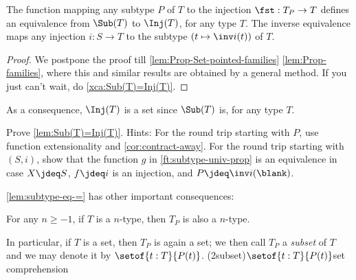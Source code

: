 \begin{lemma}\label{lem:Sub(T)=Inj(T)}
The function mapping any subtype $P$ of $T$ to the injection 
$\fst: T_P\to T$ defines an
equivalence from $\Sub(T)$ to $\Inj(T)$, for any type $T$.
The inverse equivalence maps any injection $i:S\to T$ to 
the subtype $(t\mapsto \inv i (t))$ of $T$.
\end{lemma}
\begin{proof}
We postpone the proof till \cref{lem:Prop-Set-pointed-families}
\ref{lem:Prop-families}, where this and similar results are obtained 
by a general method. If you just can't wait, do \cref{xca:Sub(T)=Inj(T)}.
\end{proof}

As a consequence, $\Inj(T)$ is a set since $\Sub(T)$ is, for any type $T$.
\addtocounter{footnote}{-1}

\begin{xca}\label{xca:Sub(T)=Inj(T)}
Prove \cref{lem:Sub(T)=Inj(T)}. Hints: %
For the round trip starting with $P$, use function extensionality and
\cref{cor:contract-away}. For the round trip starting with $(S,i)$,
show that the function $g$ in \cref{ft:subtype-univ-prop} is an equivalence
in case $X\jdeq S$, $f\jdeq i$ is an injection, and $P\jdeq\inv i(\blank)$.
\end{xca}

\cref{lem:subtype-eq-=} has other important consequences:
\begin{corollary}\label{cor:subtype-same-level}
  For any $n\geq -1$,
  if $T$ is a $n$-type, then $T_P$ is also a $n$-type.
\end{corollary}
In particular, if $T$ is a set, then $T_P$ is again a set;
we then call $T_P$ a \emph{subset} of $T$ and we may denote it by
$\setof{t:T}{P(t)}$.\footnotemark
\glossary(2subset){$\setof{t:T}{P(t)}$}{set comprehension}

